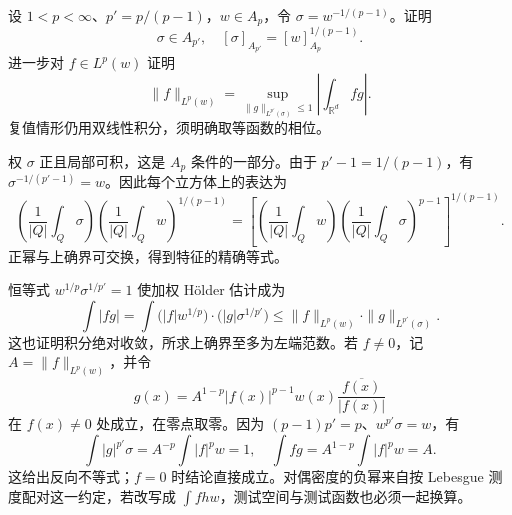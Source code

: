 \begin{exercise}\label{b2:ex:app-C-7}
设 \(1<p<\infty\)、\(p'=p/(p-1)\)，\(w\in A_p\)，令 \(\sigma=w^{-1/(p-1)}\)。证明
\[
 \sigma\in A_{p'},\quad [\sigma]_{A_{p'}}=[w]_{A_p}^{1/(p-1)}.
\]
进一步对 \(f\in L^p(w)\) 证明
\[
 \|f\|_{L^p(w)}=
 \sup_{\|g\|_{L^{p'}(\sigma)}\leq1}\left|\int_{\mathbb R^d}fg\right|.
\]
复值情形仍用双线性积分，须明确取等函数的相位。
\end{exercise}
\begin{solution}
权 \(\sigma\) 正且局部可积，这是 \(A_p\) 条件的一部分。由于
\(p'-1=1/(p-1)\)，有 \(\sigma^{-1/(p'-1)}=w\)。因此每个立方体上的表达为
\[
 \left(\frac1{|Q|}\int_Q\sigma\right)
 \left(\frac1{|Q|}\int_Qw\right)^{1/(p-1)}
 =\left[
 \left(\frac1{|Q|}\int_Qw\right)
 \left(\frac1{|Q|}\int_Q\sigma\right)^{p-1}
 \right]^{1/(p-1)}.
\]
正幂与上确界可交换，得到特征的精确等式。

恒等式 \(w^{1/p}\sigma^{1/p'}=1\) 使加权 Hölder 估计成为
\[
 \int|fg|=\int\bigl(|f|w^{1/p}\bigr)
                     \cdot\bigl(|g|\sigma^{1/p'}\bigr)
 \leq\|f\|_{L^p(w)}\cdot\|g\|_{L^{p'}(\sigma)}.
\]
这也证明积分绝对收敛，所求上确界至多为左端范数。若 \(f\ne0\)，记 \(A=\|f\|_{L^p(w)}\)，并令
\[
 g(x)=A^{1-p}|f(x)|^{p-1}w(x)\frac{\overline{f(x)}}{|f(x)|}
\]
在 \(f(x)\ne0\) 处成立，在零点取零。因为 \((p-1)p'=p\)、\(w^{p'}\sigma=w\)，有
\[
 \int|g|^{p'}\sigma=A^{-p}\int|f|^pw=1,
 \quad \int fg=A^{1-p}\int|f|^pw=A.
\]
这给出反向不等式；\(f=0\) 时结论直接成立。对偶密度的负幂来自按 Lebesgue 测度配对这一约定，若改写成 \(\int fhw\)，测试空间与测试函数也必须一起换算。
\end{solution}


